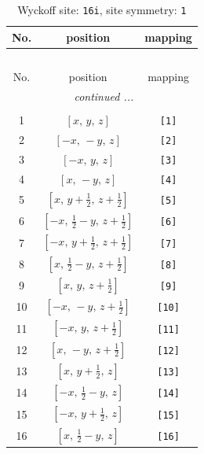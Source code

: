 \documentclass[fleqn,8pt]{jsarticle}
\begin{document}
\begin{longtable}{ccc}
\caption{Wyckoff site: {\tt 16i}, site symmetry: {\tt 1}}
 \\
 \hline \hline
No. & position & mapping \\ \hline \endfirsthead

\multicolumn{2}{l}{\tablename\ \thetable{}} \\
 \hline \hline
No. & position & mapping \\ \hline \endhead

 \hline \hline
\multicolumn{2}{r}{\footnotesize\it continued ...} \\ \endfoot

 \hline \hline
\multicolumn{2}{r}{} \\ \endlastfoot

1 & $\left[ x,\, y,\, z \right]$ & {\tt [1]} \\ \hline
2 & $\left[ - x,\, - y,\, z \right]$ & {\tt [2]} \\ \hline
3 & $\left[ - x,\, y,\, z \right]$ & {\tt [3]} \\ \hline
4 & $\left[ x,\, - y,\, z \right]$ & {\tt [4]} \\ \hline
5 & $\left[ x,\, y + \frac{1}{2},\, z + \frac{1}{2} \right]$ & {\tt [5]} \\ \hline
6 & $\left[ - x,\, \frac{1}{2} - y,\, z + \frac{1}{2} \right]$ & {\tt [6]} \\ \hline
7 & $\left[ - x,\, y + \frac{1}{2},\, z + \frac{1}{2} \right]$ & {\tt [7]} \\ \hline
8 & $\left[ x,\, \frac{1}{2} - y,\, z + \frac{1}{2} \right]$ & {\tt [8]} \\ \hline
9 & $\left[ x,\, y,\, z + \frac{1}{2} \right]$ & {\tt [9]} \\ \hline
10 & $\left[ - x,\, - y,\, z + \frac{1}{2} \right]$ & {\tt [10]} \\ \hline
11 & $\left[ - x,\, y,\, z + \frac{1}{2} \right]$ & {\tt [11]} \\ \hline
12 & $\left[ x,\, - y,\, z + \frac{1}{2} \right]$ & {\tt [12]} \\ \hline
13 & $\left[ x,\, y + \frac{1}{2},\, z \right]$ & {\tt [13]} \\ \hline
14 & $\left[ - x,\, \frac{1}{2} - y,\, z \right]$ & {\tt [14]} \\ \hline
15 & $\left[ - x,\, y + \frac{1}{2},\, z \right]$ & {\tt [15]} \\ \hline
16 & $\left[ x,\, \frac{1}{2} - y,\, z \right]$ & {\tt [16]} \\
\end{longtable}
\end{document}

